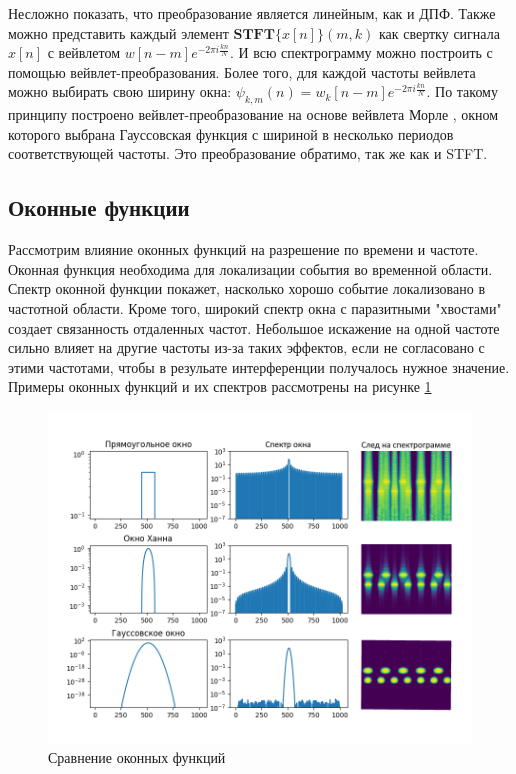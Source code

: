 Несложно показать, что преобразование является линейным, как и ДПФ.
Также можно представить каждый элемент $\textbf{STFT}\{x[n]\} (m, k)$ как свертку сигнала $x[n]$ с вейвлетом $w[n - m] e^{-2\pi i  \frac{k n}{N}}$.
И всю спектрограмму можно построить с помощью вейвлет-преобразования. Более того, для каждой частоты вейвлета можно выбирать свою ширину окна: 
$\psi_{k,m}(n) = w_k[n - m] e^{-2\pi i  \frac{k n}{N}}$. По такому принципу построено вейвлет-преобразование на основе вейвлета Морле \cite{MorleWavelet}, 
окном которого выбрана Гауссовская функция с шириной в несколько периодов соответствующей частоты. Это преобразование обратимо, так же как и STFT.

\subsection{Оконные функции}

Рассмотрим влияние оконных функций на разрешение по времени и частоте. 
Оконная функция необходима для локализации события во временной области. 
Спектр оконной функции покажет, насколько хорошо событие локализовано в частотной области.
Кроме того, широкий спектр окна с паразитными "хвостами" создает связанность отдаленных частот. 
Небольшое искажение на одной частоте сильно влияет на другие частоты из-за таких эффектов, если не согласовано с этими частотами, 
чтобы в резульате интерференции получалось нужное значение. Примеры оконных функций и их спектров рассмотрены на рисунке \ref{fig:windows}

\begin{figure}[t]
  \centering
  \includegraphics[width=16cm]{figures/windows}
  \caption{Сравнение оконных функций}
  \label{fig:windows}
\end{figure}

